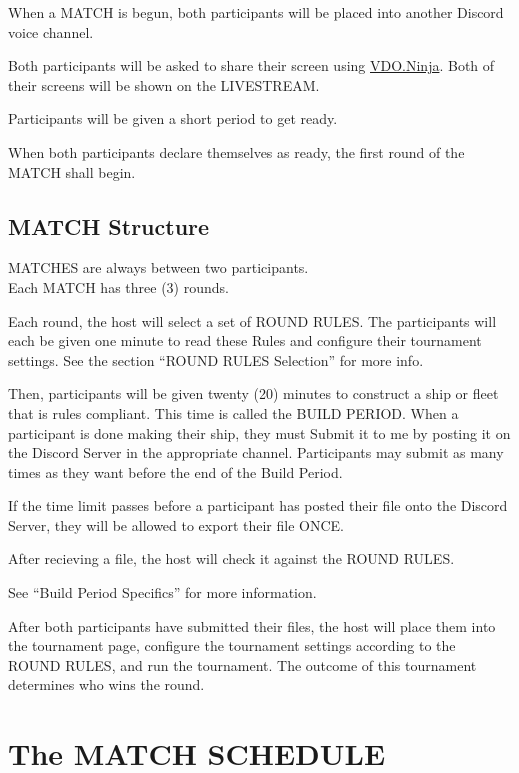 \documentclass[11pt]{article}
\newcommand{\termemph}[1]{\uppercase{#1}}
\begin{document}
When a \termemph{match} is begun, both participants will be placed into another Discord voice channel.

Both participants will be asked to share their screen using \href{https://vdo.ninja/}{VDO.Ninja}.
Both of their screens will be shown on the \termemph{Livestream}.

Participants will be given a short period to get ready. 

When both participants declare themselves as ready, the first round of the \termemph{match} shall begin.

\subsection{\termemph{match} Structure}
\termemph{matches} are always between two participants.\\
Each \termemph{match} has three (3) rounds.

Each round, the host will select a set of \termemph{Round Rules}. The participants will each be given 
one minute to read these Rules and configure their tournament settings. See the section 
``\termemph{Round Rules} Selection'' for more info.

Then, participants will be given twenty (20) minutes to construct a ship or fleet that is rules
compliant.
This time is called the \termemph{Build Period}.
When a participant is done making their ship, they must Submit it to me by posting it on the 
Discord Server in the appropriate channel. Participants may submit as many times as they want
before the end of the Build Period.

If the time limit passes before a participant has posted their file onto the Discord Server, they 
will be allowed to export their file ONCE.

After recieving a file, the host will check it against the \termemph{Round Rules}.

See ``Build Period Specifics'' for more information.

After both participants have submitted their files, the host will place them into the tournament 
page, configure the tournament settings according to the \termemph{Round Rules}, and run the
tournament. The outcome of this tournament determines who wins the round.

\section{The \termemph{Match Schedule}}
\end{document}
